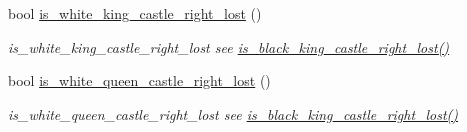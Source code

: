 \begin{DoxyCompactItemize}
bool \hyperlink{classchess_1_1Board_a9a959761717852a29b9d07964146c28e}{is\-\_\-white\-\_\-king\-\_\-castle\-\_\-right\-\_\-lost} ()
\begin{DoxyCompactList}\small\item\em is\-\_\-white\-\_\-king\-\_\-castle\-\_\-right\-\_\-lost see \hyperlink{classchess_1_1Board_a4d4dcba09aa3863ad90bb170d7d928be}{is\-\_\-black\-\_\-king\-\_\-castle\-\_\-right\-\_\-lost()} \end{DoxyCompactList}\item 
bool \hyperlink{classchess_1_1Board_a872cf3888b3b7456f0f641d10a614e5c}{is\-\_\-white\-\_\-queen\-\_\-castle\-\_\-right\-\_\-lost} ()
\begin{DoxyCompactList}\small\item\em is\-\_\-white\-\_\-queen\-\_\-castle\-\_\-right\-\_\-lost see \hyperlink{classchess_1_1Board_a4d4dcba09aa3863ad90bb170d7d928be}{is\-\_\-black\-\_\-king\-\_\-castle\-\_\-right\-\_\-lost()} \end{DoxyCompactList}\end{DoxyCompactItemize}
